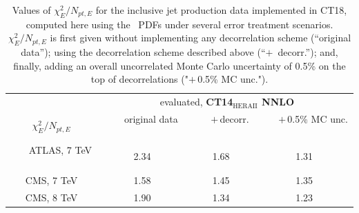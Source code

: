 \begin{table}[tb]
	\begin{tabular}{c|ccc}
		\hline
		\hline
       	&	\multicolumn{3}{c}{evaluated, {\bf CT14$_\mathrm{HERAII}$ NNLO}} 	\ \ \ \\
		\ \ \  $\chi^2_E/N_{pt,E}$ \ \ \	& \ \ \ original data \ \ \  &  \ \ \  $+$\,decorr. \ \ \    &  \ \ \  $+$\,0.5\% MC unc. \ \ \   \\
		\hline
		\ \ \ ATLAS, 7 TeV \ \ \   &  \ \ \  2.34 \ \ \   &  \ \ \  1.68 \ \ \   &  \ \ \  1.31 \ \ \   \\
		\ \ \ CMS, 7 TeV   \ \ \   &  \ \ \  1.58 \ \ \   &  \ \ \  1.45 \ \ \   &  \ \ \  1.35 \ \ \   \\
		\ \ \ CMS, 8 TeV   \ \ \   &  \ \ \  1.90 \ \ \   &  \ \ \  1.34 \ \ \   &  \ \ \  1.23 \ \ \   \\
		\hline
		\hline
	\end{tabular}
	\caption{Values of $\chi^2_E/N_{pt,E}$ for the inclusive jet production data implemented in CT18,
		computed here using the \CTHERAII~PDFs \cite{Hou:2016nqm} under several error treatment scenarios. $\chi^2_E/N_{pt,E}$ is first given without
		implementing any decorrelation scheme (``original data''); using the decorrelation scheme described
		above (``$+$\, decorr.''); and, finally, adding an overall uncorrelated Monte Carlo uncertainty of 0.5\% on the top of decorrelations ("$+$\,0.5\% MC unc.").
	}
	\label{tab-chi}
\end{table}

